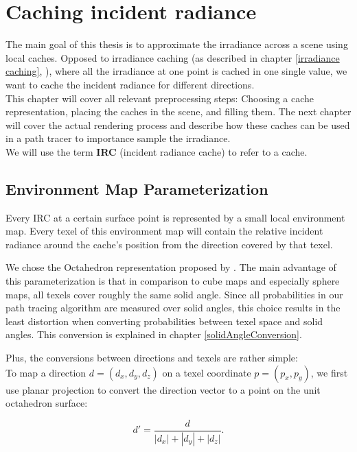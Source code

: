\chapter{Caching incident radiance}
\label{chapter:irradiance_caching}
The main goal of this thesis is to approximate the irradiance across a scene using local caches. Opposed to irradiance caching (as described in chapter \ref{irradiance caching}, \cite{ward}), where all the irradiance at one point is cached in one single value, we want to cache the incident radiance for different directions.\\
This chapter will cover all relevant preprocessing steps: Choosing a cache representation, placing the caches in the scene, and filling them. The next chapter will cover the actual rendering process and describe how these caches can be used in a path tracer to importance sample the irradiance.\\
We will use the term \textbf{IRC} (incident radiance cache) to refer to a cache.

\section{Environment Map Parameterization}
\label{envmap param}
Every IRC at a certain surface point is represented by a small local environment map. Every texel of this environment map will contain the relative incident radiance around the cache's position from the direction covered by that texel.

We chose the Octahedron representation proposed by \cite{octahedronpaper}. The main advantage of this parameterization is that in comparison to cube maps and especially sphere maps, all texels cover roughly the same solid angle. Since all probabilities in our path tracing algorithm are measured over solid angles, this choice results in the least distortion when converting probabilities between texel space and solid angles. This conversion is explained in chapter \ref{solidAngleConversion}.

Plus, the conversions between directions and texels are rather simple:\\
To map a direction $d=(d_x,d_y,d_z)$ on a texel coordinate $p = (p_x,p_y)$, we first use planar projection to convert the direction vector to a point on the unit octahedron surface:

\begin{equation}
d' = \frac{d}{|d_x| + |d_y| + |d_z|}.
\label{planar_projection}
\end{equation}


